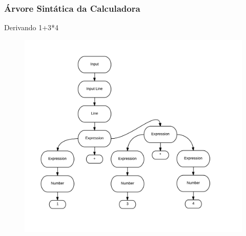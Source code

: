 \documentclass{beamer}
\begin{document}
\begin {frame}
\frametitle{Árvore Sintática da Calculadora }
Derivando 1+3*4

\begin{figure} 	%
            \centering		%
            \includegraphics[scale=0.12]{3.png} %
            \end{figure} 

\end{frame}
\end{document}
